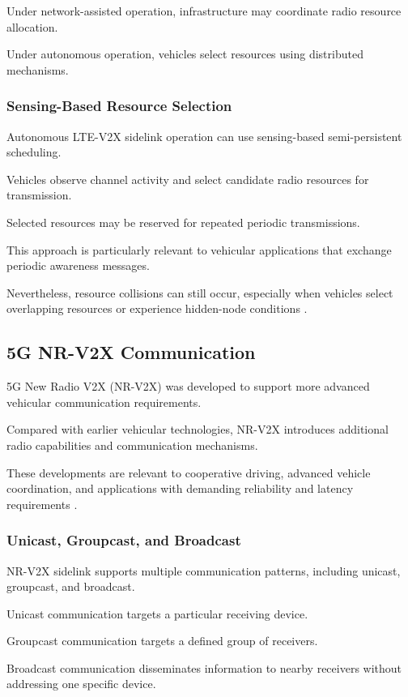 Under network-assisted
operation, infrastructure
may coordinate radio
resource allocation.

Under autonomous operation,
vehicles select resources
using distributed mechanisms.

\subsubsection{Sensing-Based Resource Selection}

Autonomous LTE-V2X sidelink
operation can use sensing-based
semi-persistent scheduling.

Vehicles observe channel
activity and select candidate
radio resources for
transmission.

Selected resources may be
reserved for repeated
periodic transmissions.

This approach is particularly
relevant to vehicular
applications that exchange
periodic awareness messages.

Nevertheless, resource
collisions can still occur,
especially when vehicles
select overlapping resources
or experience hidden-node
conditions \cite{Molina2017}.

\subsection{5G NR-V2X Communication}

5G New Radio V2X (NR-V2X)
was developed to support
more advanced vehicular
communication requirements.

Compared with earlier
vehicular technologies,
NR-V2X introduces additional
radio capabilities and
communication mechanisms.

These developments are
relevant to cooperative
driving, advanced
vehicle coordination,
and applications with
demanding reliability
and latency requirements
\cite{Naik2019}.

\subsubsection{Unicast, Groupcast, and Broadcast}

NR-V2X sidelink supports
multiple communication
patterns, including
unicast, groupcast,
and broadcast.

Unicast communication
targets a particular
receiving device.

Groupcast communication
targets a defined group
of receivers.

Broadcast communication
disseminates information
to nearby receivers
without addressing
one specific device.

